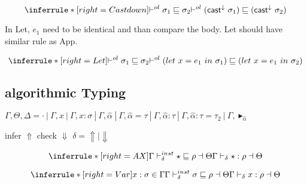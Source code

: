 \[
\inferrule*[right=Castdown]
{
 \olpolymorphic {\sigma_1} {\sigma_2}}
 { \olpolymorphic {(\castdowne \sigma_1)} {(\castdowne \sigma_2)}}
\]

In Let, $e_1$ need to be identical and than compare the body. Let should have similar rule as App.

\[
\inferrule*[right=Let]
{
\olpolymorphic {\sigma_1} {\sigma_2 }}
{\olpolymorphic {(let\ x = e_1\ in\ \sigma_1)} {(let\ x = e_1\ in\ \sigma_2) }}
\]


\clearpage

\fi

\subsection{algorithmic Typing}

\newcommand{\checktype}{\Gamma\vdash_\Downarrow}
\newcommand{\infertype}{\Gamma\vdash_\Uparrow}
\newcommand{\infercheck}{\Gamma\vdash_\delta}

\newcommand{\checktypeno}{\vdash_\Downarrow}
\newcommand{\infertypeno}{\vdash_\Uparrow}
\newcommand{\infercheckno}{\vdash_\delta}

\newcommand{\instinfer}{\vdash^{inst}_\Uparrow}
\newcommand{\instcheck}{\vdash^{inst}_\Downarrow}
\newcommand{\instinfercheck}{\vdash^{inst}_\delta}

\newcommand{\polyinfer}{\Gamma\vdash^{poly}_\Uparrow}
\newcommand{\polycheck}{\Gamma\vdash^{poly}_\Downarrow}
\newcommand{\polycheckno}{\vdash^{poly}_\Downarrow}
\newcommand{\polyinfercheck}{\vdash^{poly}_\delta}

\newcommand{\dsk}{\vdash^{dsk}}

\newcommand{\unify}{\vdash^{unify}}


$\Gamma, \Theta, \Delta  = \cdot~|~\Gamma, x~|~\Gamma, x:\sigma~|~\Gamma, \widehat{\alpha}~|~\Gamma, \widehat{\alpha}=\tau~|~\Gamma, \widehat{\alpha}:\tau~|~\Gamma, \widehat{\alpha}:\tau = \tau_2~|~\Gamma, \blacktriangleright_{\widehat \alpha}$

\framebox{$ \infercheck e : \rho \dashv \Theta $ } infer $\Uparrow$ check $\Downarrow$ $\delta = \Uparrow \mid \Downarrow$

\[
\inferrule*[right=AX]
{\Gamma \instinfercheck \star \sqsubseteq \rho \dashv \Theta}
{\infercheck \star : \rho \dashv \Theta}
\]

\[
\inferrule*[right=Var]
{x:\sigma \in \Gamma \\ \Gamma \instinfercheck \sigma \sqsubseteq \rho \dashv \Theta }
{\infercheck x : \rho \dashv \Theta}
\]

